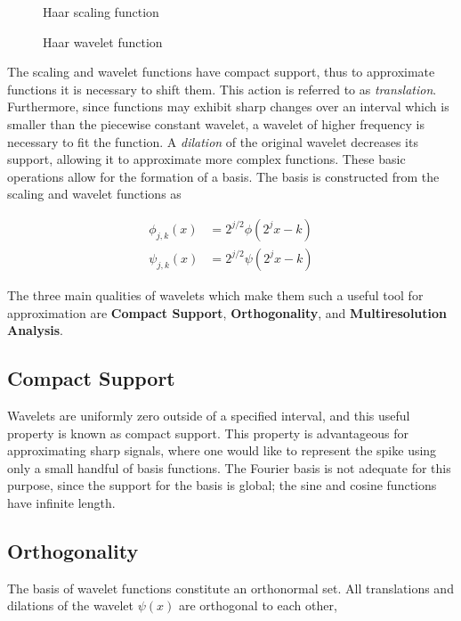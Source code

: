 \documentclass[11pt]{article}
\begin{document}
\begin{figure}[H]
	\centering
	
	\caption{Haar scaling function}
	\label{fig:haar_scaling}
\end{figure}

\begin{figure}[H]
	\centering
	
	\caption{Haar wavelet function}
	\label{fig:haar_wavelet}
\end{figure}

The scaling and wavelet functions have compact support, thus to approximate functions it is necessary to shift them. 
This action is referred to as \textit{translation}. Furthermore, since functions may exhibit sharp changes over an
interval which is smaller than the piecewise constant wavelet, a wavelet of higher frequency is necessary
to fit the function. A \textit{dilation} of the original wavelet decreases its support, allowing it to 
approximate more complex functions. These basic operations allow for the formation of a basis.
The basis is constructed from the scaling and wavelet functions as

\begin{align}
\phi_{j,k}(x) & = 2^{j/2} \phi(2^j x - k) \\
\psi_{j,k}(x) & = 2^{j/2} \psi(2^j x - k) 
\label{dilation equation}
\end{align}

The three main qualities of wavelets which make them such a useful tool for 
approximation are \textbf{Compact Support}, \textbf{Orthogonality}, and \textbf{Multiresolution Analysis}.

\subsection{Compact Support}
Wavelets are uniformly zero outside of a specified interval, and this useful property is known as compact support.
This property is advantageous for approximating sharp signals, where one would like to represent the spike using only a small 
handful of basis functions. The Fourier basis is not adequate for this purpose, since the support for the basis is global; 
the sine and cosine functions have infinite length. 

\subsection{Orthogonality}
The basis of wavelet functions constitute an orthonormal set. All translations and dilations of the 
wavelet $\psi(x)$ are orthogonal to each other,
\end{document}

